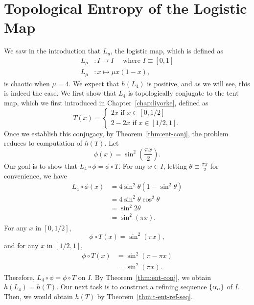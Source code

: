 \documentclass[10pt,twoside,draft]{book}
\begin{document}
\section{Topological Entropy of the Logistic Map}
We saw in the introduction that $L_u$, the logistic map, which is defined as
\begin{align*}
  L_\mu&: I \to I \quad\mbox{ where } I \equiv [0,1] \\
  L_\mu&: x \mapsto \mu x (1-x),
\end{align*}
is chaotic when $\mu = 4$.
We expect that $h(L_4)$ is positive, and as we will see, this is indeed the case. 
We first show that $L_4$ is topologically conjugate to the tent map, which we first introduced in Chapter~\ref{chap:liyorke}, defined as
\begin{equation*}
  T(x) = 
  \begin{cases}
    2x \mbox{ if } x \in [0,1/2] \\
    2 - 2x \mbox{ if } x \in [1/2,1].
  \end{cases}
\end{equation*}
Once we establish this conjugacy, by Theorem~\ref{thm:ent-conj}, the problem reduces to computation of $h(T)$.
Let
\begin{equation*}
  \phi(x) = \sin^2(\frac{\pi x}{2}).
\end{equation*}
Our goal is to show that $L_4 \circ \phi = \phi \circ T$.
For any $x \in I$, letting $\theta \equiv \frac{\pi x}{2}$ for convenience, we have
\begin{align*}
  L_4 \circ \phi(x)
  &= 4\sin^2\theta(1 - \sin^2\theta) \\
  &= 4\sin^2\theta \cos^2\theta \\
  &= \sin^2 2\theta \\
  &= \sin^2 (\pi x).
\end{align*}
For any $x$ in $[0,1/2]$,
\begin{equation*}
  \phi \circ T(x)
  = \sin^2(\pi x),
\end{equation*}
and for any $x$ in $[1/2,1]$,
\begin{align*}
  \phi \circ T(x)
  &= \sin^2(\pi - \pi x) \\
  &= \sin^2(\pi x).
\end{align*}
Therefore, $L_4 \circ \phi = \phi \circ T$ on $I$.
By Theorem~\ref{thm:ent-conj}, we obtain $h(L_4) = h(T)$.
Our next task is to construct a refining sequence $\left \{ \alpha_n \right \}$ of $I$.
Then, we would obtain $h(T)$ by Theorem~\ref{thm:t-ent-ref-seq}.
\end{document}
